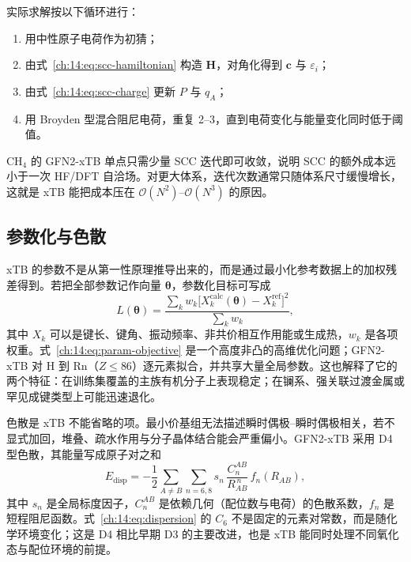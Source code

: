 实际求解按以下循环进行：
\begin{enumerate}
  \item 用中性原子电荷作为初猜；
  \item 由式~\eqref{ch:14:eq:scc-hamiltonian} 构造 $\mathbf{H}$，对角化得到 $\mathbf{c}$ 与 $\varepsilon_i$；
  \item 由式~\eqref{ch:14:eq:scc-charge} 更新 $P$ 与 $q_A$；
  \item 用 Broyden 型混合阻尼电荷，重复 2--3，直到电荷变化与能量变化同时低于阈值。
\end{enumerate}
CH$_4$ 的 GFN2-xTB 单点只需少量 SCC 迭代即可收敛，说明 SCC 的额外成本远小于一次 HF/DFT 自洽场。对更大体系，迭代次数通常只随体系尺寸缓慢增长，这就是 xTB 能把成本压在 $\mathcal{O}(N^2)$–$\mathcal{O}(N^3)$ 的原因。

\subsection{参数化与色散}
\label{ch:14:sec:param}

xTB 的参数不是从第一性原理推导出来的，而是通过最小化参考数据上的加权残差得到。若把全部参数记作向量 $\boldsymbol{\theta}$，参数化目标可写成
\begin{equation}
L(\boldsymbol{\theta})
= \frac{\sum_k w_k\bigl[X_k^{\mathrm{calc}}(\boldsymbol{\theta})-X_k^{\mathrm{ref}}\bigr]^2}
{\sum_k w_k},
\label{ch:14:eq:param-objective}
\end{equation}
其中 $X_k$ 可以是键长、键角、振动频率、非共价相互作用能或生成热，$w_k$ 是各项权重。式~\eqref{ch:14:eq:param-objective} 是一个高度非凸的高维优化问题；GFN2-xTB 对 H 到 Rn（$Z\le 86$）逐元素拟合，并共享大量全局参数\citep{bannwarth2019gfn2}。这也解释了它的两个特征：在训练集覆盖的主族有机分子上表现稳定；在镧系、强关联过渡金属或罕见成键类型上可能迅速退化。

色散是 xTB 不能省略的项。最小价基组无法描述瞬时偶极--瞬时偶极相关，若不显式加回，堆叠、疏水作用与分子晶体结合能会严重偏小。GFN2-xTB 采用 D4 型色散\citep{caldeweyher2019d4}，其能量写成原子对之和
\begin{equation}
E_{\mathrm{disp}}
= -\frac12\sum_{A\neq B}\sum_{n=6,8}
s_n\,\frac{C_n^{AB}}{R_{AB}^{\,n}}\,f_n(R_{AB}),
\label{ch:14:eq:dispersion}
\end{equation}
其中 $s_n$ 是全局标度因子，$C_n^{AB}$ 是依赖几何（配位数与电荷）的色散系数，$f_n$ 是短程阻尼函数。式~\eqref{ch:14:eq:dispersion} 的 $C_6$ 不是固定的元素对常数，而是随化学环境变化；这是 D4 相比早期 D3 的主要改进，也是 xTB 能同时处理不同氧化态与配位环境的前提。

